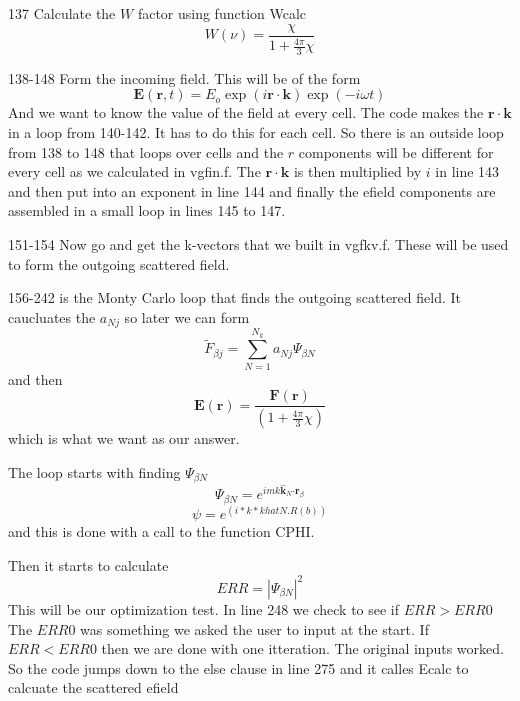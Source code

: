 \documentclass{article}
\begin{document}
137 Calculate the $W$ factor using function Wcalc%
\[
W\left( \nu \right) =\frac{\chi }{1+\frac{4\pi }{3}\chi } 
\]

138-148 Form the incoming field. This will be of the form 
\[
\mathbf{E}\left( \mathbf{r},t\right) =E_{o}\exp \left( i\mathbf{r}\cdot 
\mathbf{k}\right) \exp (-i\omega t)
\]%
And we want to know the value of the field at every cell. The code makes the 
$\mathbf{r}\cdot \mathbf{k}$ in a loop from 140-142. It has to do this for
each cell. So there is an outside loop from 138 to 148 that loops over cells
and the $r$ components will be different for every cell as we calculated in
vgfin.f. The $\mathbf{r}\cdot \mathbf{k}$ is then multiplied by $i$ in line
143 and then put into an exponent in line 144 and finally the efield
components are assembled in a small loop in lines 145 to 147.

151-154 Now go and get the k-vectors that we built in vgfkv.f. These will be
used to form the outgoing scattered field.

156-242 is the Monty Carlo loop that finds the outgoing scattered field. It
caucluates the $a_{Nj}$ so later we can form  
\[
\tilde{F}_{\beta j}\mathbf{=}\sum_{N=1}^{N_{k}}a_{Nj}\Psi _{\beta N}
\]%
and then 
\[
\mathbf{E}(\mathbf{r})=\frac{\mathbf{F}(\mathbf{r})}{(1+\frac{4\pi }{3}\chi )%
}
\]%
which is what we want as our answer.

The loop starts with finding $\Psi _{\beta N}$%
\[
\Psi _{\beta N}=e^{imk\mathbf{\hat{k}}_{N}\mathbf{\cdot r}_{\beta }}
\]%
\[
\psi =e^{(i\ast k\ast khatN.R(b))}
\]%
and this is done with a call to the function CPHI.

Then it starts to calculate 
\[
ERR=\left\vert \Psi _{\beta N}\right\vert ^{2}
\]%
This will be our optimization test. In line 248 we check to see if $ERR>ERR0$
The $ERR0$ was something we asked the user to input at the start. If $%
ERR<ERR0$ then we are done with one itteration. The original inputs worked.
So the code jumps down to the else clause in line 275 and it calles Ecalc to
calcuate the scattered efield
\end{document}

